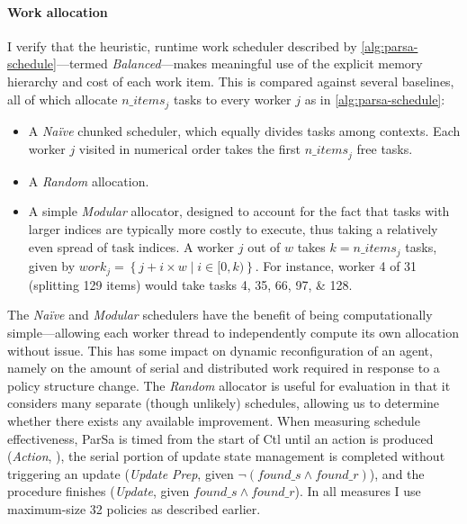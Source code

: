 \paragraph{Work allocation}
I verify that the heuristic, runtime work scheduler described by \cref{alg:parsa-schedule}---termed \emph{Balanced}---makes meaningful use of the explicit memory hierarchy and cost of each work item.
This is compared against several baselines, all of which allocate $\mathit{n\_items}_j$ tasks to every worker $j$ as in \cref{alg:parsa-schedule}:
\begin{itemize}
	\item A \emph{Na\"{i}ve} chunked scheduler, which equally divides tasks among contexts. Each worker $j$ visited in numerical order takes the first $\mathit{n\_items}_j$ free tasks.
	\item A \emph{Random} allocation.
	\item A simple \emph{Modular} allocator, designed to account for the fact that tasks with larger indices are typically more costly to execute, thus taking a relatively even spread of task indices. A worker $j$ out of $w$ takes $k=\mathit{n\_items}_j$ tasks, given by $\mathit{work}_j=\left\{j + i \times w \mid i \in [0,k) \right\}$. For instance, worker \num{4} of \num{31} (splitting \num{129} items) would take tasks \numlist{4;35;66;97;128}.
\end{itemize}
The \emph{Na\"{i}ve} and \emph{Modular} schedulers have the benefit of being computationally simple---allowing each worker thread to independently compute its own allocation without issue.
This has some impact on dynamic reconfiguration of an \approachshort{} agent, namely on the amount of serial and distributed work required in response to a policy structure change.
The \emph{Random} allocator is useful for evaluation in that it considers many separate (though unlikely) schedules, allowing us to determine whether there exists any available improvement.
When measuring schedule effectiveness, ParSa is timed from the start of Ctl until an action is produced (\emph{Action}, ), the serial portion of update state management is completed without triggering an update (\emph{Update Prep},  given $\lnot \left(\mathit{found\_s} \land{} \mathit{found\_r}\right)$), and the procedure finishes (\emph{Update},  given $\mathit{found\_s} \land{} \mathit{found\_r}$).
In all measures I use maximum-size \qty{32}{\bit} policies as described earlier.

